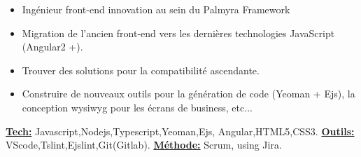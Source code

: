 \documentclass[10pt,a4paper]{altacv}
\begin{document}

\begin{fullwidth}
\makecvheader
\end{fullwidth}



\begin{itemize}
\item Ingénieur front-end innovation au sein du Palmyra Framework
\item Migration de l'ancien front-end vers les dernières technologies JavaScript (Angular2 +).
\item Trouver des solutions pour la compatibilité ascendante.
\item 
Construire de nouveaux outils pour la génération de code (Yeoman + Ejs), la conception wysiwyg pour les écrans de business, etc...
\end{itemize}
\underline{\textbf{Tech:}} Javascript,Nodejs,Typescript,Yeoman,Ejs, Angular,HTML5,CSS3.
\newline
\underline{\textbf{Outils:}} VScode,Tslint,Ejslint,Git(Gitlab).
\newline
\underline{\textbf{Méthode:}} Scrum, using Jira.
\divider
\end{document}
